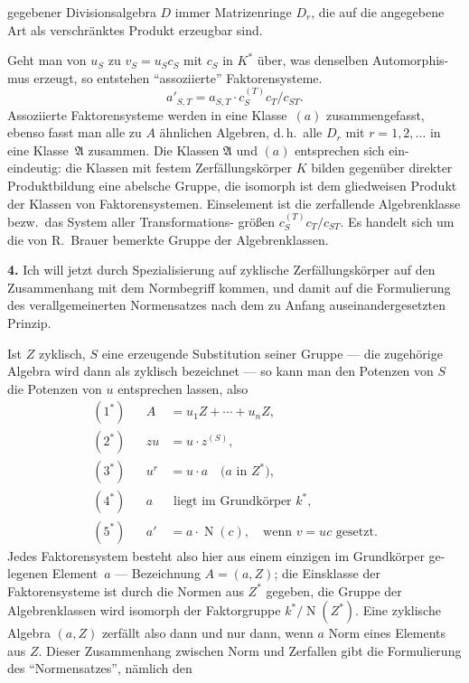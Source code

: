 \documentclass[12pt,a4paper]{article}
\theoremstyle{plain}
\DeclareMathOperator{\Norm}{N}
\newcommand{\alg}[1]{\mathfrak{#1}}
\begin{document}
\noindent
gegebener Divisionsalgebra $D$ immer Matrizenringe $D_r$, die auf die angegebene
Art als verschr\"anktes Produkt erzeugbar sind.

Geht man von $u_S$ zu $v_S = u_S c_S$ mit $c_S$ in $K^*$ \"uber, was denselben Automorphis-
mus erzeugt, so entstehen ``assoziierte'' Faktorensysteme.
\begin{equation}\label{eq:5}
a'_{S,T} = a_{S,T} \cdot c_S^{(T)} c_T / c_{ST}.
\end{equation}
Assoziierte Faktorensysteme werden in eine Klasse~$(a)$ zusammengefasst, ebenso
fasst man alle zu $A$ \"ahnlichen Algebren, d.\,h.\ alle $D_r$ mit $r = 1, 2,\ldots$ in eine Klasse~$\alg{A}$
zusammen. Die Klassen $\alg{A}$ und $(a)$ entsprechen sich ein-eindeutig: die Klassen mit
festem Zerf\"allungsk\"orper $K$ bilden gegen\"uber direkter Produktbildung eine abelsche
Gruppe, die isomorph ist dem gliedweisen Produkt der Klassen von Faktorensystemen.
Einselement ist die zerfallende Algebrenklasse bezw.\ das System aller Transformations-
gr\"o\ss en $c_S^{(T)} c_T/c_{ST}$. Es handelt sich um die von R.~Brauer bemerkte Gruppe der
Algebrenklassen.

\smallskip
\noindent\textbf{4.}\hspace{0.5em}%
Ich will jetzt durch Spezialisierung auf zyklische Zerf\"allungsk\"orper auf den
Zusammenhang mit dem Normbegriff kommen, und damit auf die Formulierung des
verallgemeinerten Normensatzes nach dem zu Anfang auseinandergesetzten Prinzip.

Ist $Z$ zyklisch, $S$ eine erzeugende Substitution seiner Gruppe --- die zugeh\"orige Algebra
wird dann als zyklisch bezeichnet --- so kann man den Potenzen von $S$ die Potenzen
von $u$ entsprechen lassen, also
\begin{align}
(1^*) && A &= u_1 Z + \cdots + u_n Z, \\
(2^*) && z u &= u \cdot z^{(S)}, \\
(3^*) && u^r &= u \cdot a \quad \text{($a$ in $Z^*$)}, \\
(4^*) && a &\text{ liegt im Grundk\"orper $k^*$}, \\
(5^*) && a' &= a \cdot \Norm(c), \quad \text{wenn $v = uc$ gesetzt.}
\end{align}
Jedes Faktorensystem besteht also hier aus einem einzigen im Grundk\"orper ge-
legenen Element~$a$ --- Bezeichnung $A = (a, Z)$; die Einsklasse der Faktorensysteme
ist durch die Normen aus $Z^*$ gegeben, die Gruppe der Algebrenklassen wird isomorph
der Faktorgruppe $k^*/\Norm(Z^*)$. Eine zyklische Algebra $(a, Z)$ zerf\"allt also dann und
nur dann, wenn $a$ Norm eines Elements aus $Z$. Dieser Zusammenhang zwischen
Norm und Zerfallen gibt die Formulierung des ``Normensatzes'', n\"amlich den
\end{document}
